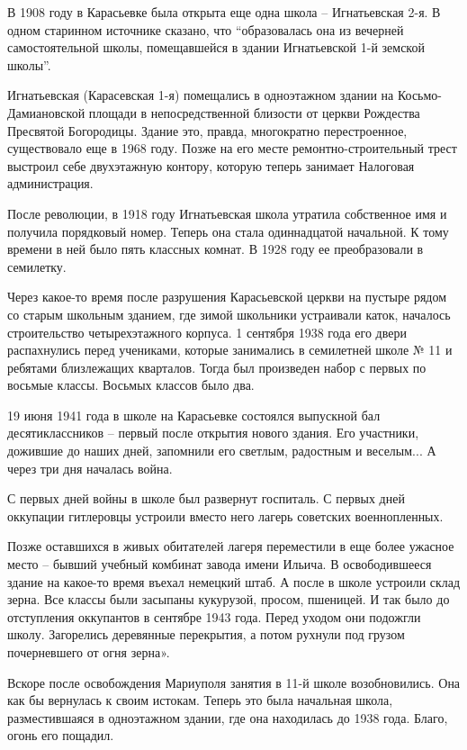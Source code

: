 В 1908 году в Карасьевке была открыта еще одна школа – Игнатьевская 2-я. В
одном старинном источнике сказано, что \enquote{образовалась она из вечерней
самостоятельной школы, помещавшейся в здании Игнатьевской 1-й земской школы}.

Игнатьевская (Карасевская 1-я) помещались в одноэтажном здании на
Косьмо-Дамиановской площади в непосредственной близости от церкви Рождества
Пресвятой Богородицы. Здание это, правда, многократно перестроенное,
существовало еще в 1968 году. Позже на его месте ремонтно-строительный трест
выстроил себе двухэтажную контору, которую теперь занимает  Налоговая
администрация. 

После революции, в 1918 году Игнатьевская школа утратила собственное имя и
получила порядковый номер. Теперь она стала одиннадцатой начальной. К тому
времени в ней было пять классных комнат. В 1928 году ее преобразовали в
семилетку.

Через какое-то время после разрушения Карасьевской церкви на пустыре рядом со
старым школьным зданием, где зимой школьники устраивали каток, началось
строительство четырехэтажного корпуса. 1 сентября 1938 года его двери
распахнулись перед учениками, которые занимались в семилетней школе № 11 и
ребятами близлежащих кварталов. Тогда был произведен набор с первых по восьмые
классы. Восьмых классов было два. 

19 июня 1941 года в школе на Карасьевке состоялся выпускной бал
десятиклассников – первый после открытия нового здания. Его участники, дожившие
до наших дней, запомнили его светлым, радостным и веселым... А через три дня
началась война.

С первых дней войны в школе был развернут госпиталь. С первых дней оккупации
гитлеровцы устроили вместо него лагерь советских военнопленных. 

Позже оставшихся в живых обитателей лагеря переместили в еще более ужасное
место – бывший учебный комбинат завода имени Ильича. В освободившееся здание на
какое-то время въехал немецкий штаб. А после в школе устроили склад зерна. Все
классы были засыпаны кукурузой, просом, пшеницей. И так было до отступления
оккупантов в сентябре 1943 года. Перед уходом они подожгли школу. Загорелись
деревянные перекрытия, а потом рухнули под грузом почерневшего от огня зерна».

Вскоре после освобождения Мариуполя занятия в 11-й школе возобновились. Она как
бы вернулась к своим истокам. Теперь это была начальная школа, разместившаяся в
одноэтажном здании, где она находилась до 1938 года. Благо, огонь его пощадил. 

